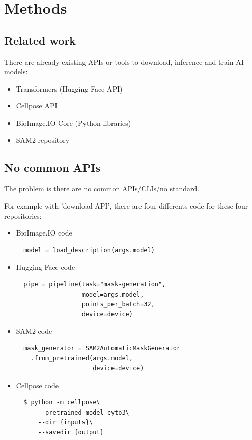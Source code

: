 \section{Methods}
\label{sec:methods}

\subsection{Related work}

There are already existing APIs or tools to download, inference and train AI
models:
\begin{itemize}
  \item Transformers (Hugging Face API) \cite{wolf-etal-2020-transformers}
  \item Cellpose API \cite{Stringer2020.02.02.931238}
  \item BioImage.IO Core (Python libraries)
  \item SAM2 repository \cite{ravi2024sam2}
\end{itemize}

\subsection{No common APIs}

The problem is there are no common APIs/\Gls{CLI}s/no standard.

For example with 'download API', there are four differents code for these four
repositories:
\begin{itemize}

  \item BioImage.IO code
  \begin{verbatim}
  model = load_description(args.model)
  \end{verbatim}

  \item Hugging Face code
  \begin{verbatim}
  pipe = pipeline(task="mask-generation",
                  model=args.model,
                  points_per_batch=32,
                  device=device)
  \end{verbatim}

  \item SAM2 code
  \begin{verbatim}
  mask_generator = SAM2AutomaticMaskGenerator
    .from_pretrained(args.model,
                     device=device)
  \end{verbatim}

  \item Cellpose code
  \begin{verbatim}
  $ python -m cellpose\
      --pretrained_model cyto3\
      --dir {inputs}\
      --savedir {output}
  \end{verbatim}
\end{itemize}

